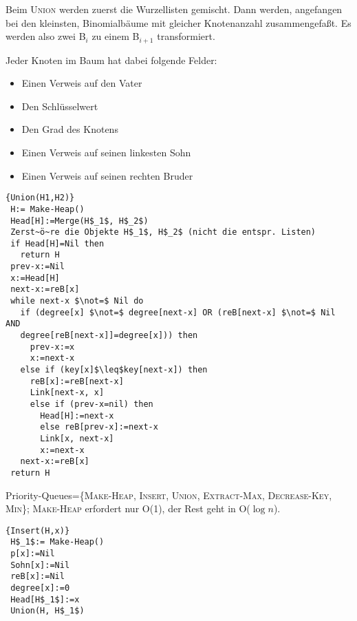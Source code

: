\documentclass[ngerman,draft,parskip=half*,twoside]{scrreprt}
\theoremstyle{break}
\begin{document}
Beim \textsc{Union} werden zuerst die Wurzellisten gemischt. Dann werden, angefangen bei den kleinsten,
Binomialbäume mit gleicher Knotenanzahl zusammengefaßt. Es werden also zwei B$_i$ zu einem B$_{i+1}$
transformiert.

Jeder Knoten im Baum hat dabei folgende Felder:
\begin{itemize}
\item Einen Verweis auf den Vater
\item Den Schlüsselwert
\item Den Grad des Knotens
\item Einen Verweis auf seinen linkesten Sohn
\item Einen Verweis auf seinen rechten Bruder
\end{itemize}

\begin{Algorithmus}[H]
\begin{lstlisting}[frame=tlrb, mathescape=true, title=\textsc{Union\textnormal{(H$_1$, H$_2$)}}, gobble=1]{Union(H1,H2)}
 H:= Make-Heap()
 Head[H]:=Merge(H$_1$, H$_2$)
 Zerst~ö~re die Objekte H$_1$, H$_2$ (nicht die entspr. Listen)
 if Head[H]=Nil then
   return H
 prev-x:=Nil
 x:=Head[H]
 next-x:=reB[x]
 while next-x $\not=$ Nil do
   if (degree[x] $\not=$ degree[next-x] OR (reB[next-x] $\not=$ Nil AND 
   degree[reB[next-x]]=degree[x])) then
     prev-x:=x
     x:=next-x
   else if (key[x]$\leq$key[next-x]) then
     reB[x]:=reB[next-x]
     Link[next-x, x]
     else if (prev-x=nil) then
       Head[H]:=next-x
       else reB[prev-x]:=next-x
       Link[x, next-x]
       x:=next-x
   next-x:=reB[x]
 return H    
\end{lstlisting}
\end{Algorithmus}

Priority-Queues=\{\textsc{Make-Heap}, \textsc{Insert}, \textsc{Union}, \textsc{Extract-Max}, \textsc{Decrease-Key},
\textsc{Min}\};
\textsc{Make-Heap} erfordert nur O(1), der Rest geht in O($\log n$).
 

\begin{Algorithmus}[H]
\begin{lstlisting}[frame=tlrb, mathescape=true, title=\textsc{Insert\textnormal{(H, x)}}, gobble=1]{Insert(H,x)}
 H$_1$:= Make-Heap()
 p[x]:=Nil
 Sohn[x]:=Nil
 reB[x]:=Nil
 degree[x]:=0
 Head[H$_1$]:=x
 Union(H, H$_1$) 
\end{lstlisting}
\end{Algorithmus}
\end{document}
